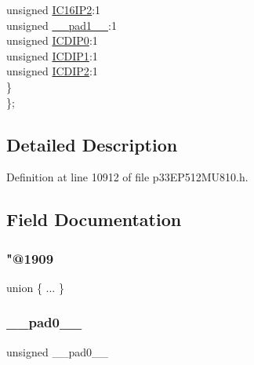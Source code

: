 \begin{DoxyCompactItemize}
\begin{tabbing}
\>\>unsigned \hyperlink{structtag_i_p_c35_b_i_t_s_af8abb1c09b6d7116ae08cc497ba4d015}{IC16IP2}:1\\
\>\>unsigned \hyperlink{structtag_i_p_c35_b_i_t_s_acaf2d0924a107ec6e8d2e31febaf66f9}{\_\_pad1\_\_}:1\\
\>\>unsigned \hyperlink{structtag_i_p_c35_b_i_t_s_ae06c6de872fb2cd5b3c77a983a614130}{ICDIP0}:1\\
\>\>unsigned \hyperlink{structtag_i_p_c35_b_i_t_s_a78d0076c394ca345b28bfdcff2211a49}{ICDIP1}:1\\
\>\>unsigned \hyperlink{structtag_i_p_c35_b_i_t_s_a672f954f7f78c38a0d3e22817ce5d83a}{ICDIP2}:1\\
\>\} \\
\}; \\

\end{tabbing}\end{DoxyCompactItemize}


\subsection{Detailed Description}


Definition at line 10912 of file p33\+E\+P512\+M\+U810.\+h.



\subsection{Field Documentation}
\mbox{\label{structtag_i_p_c35_b_i_t_s_a9d3d6b8dce4f757b5d97565832c42e39}} 
\subsubsection{\texorpdfstring{"@1909}{@1909}}
{\footnotesize\ttfamily union \{ ... \} }

\mbox{\label{structtag_i_p_c35_b_i_t_s_adf71f3d8410c1f1dbbc96680a92c49af}} 
\subsubsection{\texorpdfstring{\+\_\+\+\_\+pad0\+\_\+\+\_\+}{\_\_pad0\_\_}}
{\footnotesize\ttfamily unsigned \+\_\+\+\_\+pad0\+\_\+\+\_\+}



